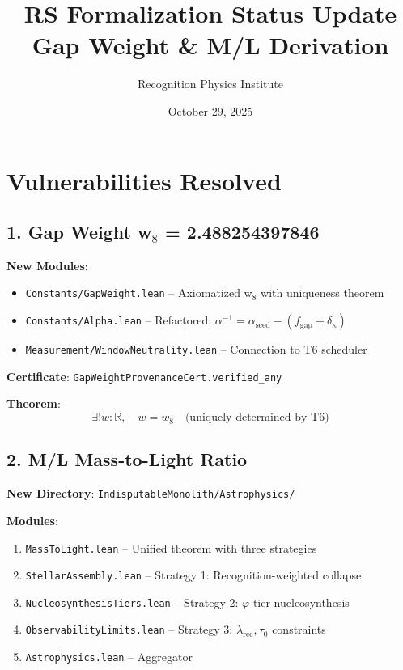 \documentclass[11pt]{article}
\title{\textbf{RS Formalization Status Update}\\
\large Gap Weight \& M/L Derivation}
\author{Recognition Physics Institute}
\date{October 29, 2025}
\begin{document}
\maketitle

\section*{Vulnerabilities Resolved}

\begin{center}
\end{center}

\subsection*{1. Gap Weight w$_8$ = 2.488254397846}

\textbf{New Modules}:
\begin{itemize}
\item \texttt{Constants/GapWeight.lean} -- Axiomatized w$_8$ with uniqueness theorem
\item \texttt{Constants/Alpha.lean} -- Refactored: $\alpha^{-1} = \alpha_{\text{seed}} - (f_{\text{gap}} + \delta_\kappa)$
\item \texttt{Measurement/WindowNeutrality.lean} -- Connection to T6 scheduler
\end{itemize}

\textbf{Certificate}: \texttt{GapWeightProvenanceCert.verified\_any}

\textbf{Theorem}:
\[
\exists! w : \mathbb{R}, \quad w = w_8 \quad \text{(uniquely determined by T6)}
\]

\subsection*{2. M/L Mass-to-Light Ratio}

\textbf{New Directory}: \texttt{IndisputableMonolith/Astrophysics/}

\textbf{Modules}:
\begin{enumerate}
\item \texttt{MassToLight.lean} -- Unified theorem with three strategies
\item \texttt{StellarAssembly.lean} -- Strategy 1: Recognition-weighted collapse
\item \texttt{NucleosynthesisTiers.lean} -- Strategy 2: $\varphi$-tier nucleosynthesis
\item \texttt{ObservabilityLimits.lean} -- Strategy 3: $\lambda_{\text{rec}}, \tau_0$ constraints
\item \texttt{Astrophysics.lean} -- Aggregator
\end{enumerate}
\end{document}
